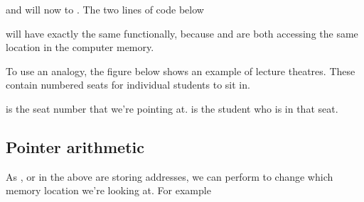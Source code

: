 \documentclass[letterpaper,10pt,british]{sphinxmanual}
\let\sphinxpxdimen\pdfpxdimen\else\newdimen\sphinxpxdimen
\begin{document}
\begin{sphinxVerbatim}[commandchars=\\\{\}]
\end{sphinxVerbatim}

\sphinxAtStartPar
and  will now  to . The two lines of code below

\begin{sphinxVerbatim}[commandchars=\\\{\}]
\end{sphinxVerbatim}

\sphinxAtStartPar
will have exactly the same functionally, because  and  are both accessing the same location in the computer memory.

\sphinxAtStartPar
To use an analogy, the figure below shows an example of lecture theatres. These contain numbered seats for individual students to sit in.

\begin{figure}[htbp]
\centering

\noindent\sphinxincludegraphics[width=800\sphinxpxdimen]{{pointer_analogy}.png}
\end{figure}

\sphinxAtStartPar
{} is the seat number that we’re pointing at.  is the student who is in that seat.


\subsection{Pointer arithmetic}
\label{\detokenize{chapters/programming_fundamentals/pointers:pointer-arithmetic}}
\sphinxAtStartPar
As , or  in the above are storing addresses, we can perform  to change which memory location we’re looking at. For example

\begin{sphinxVerbatim}[commandchars=\\\{\}]
\end{sphinxVerbatim}
\end{document}

